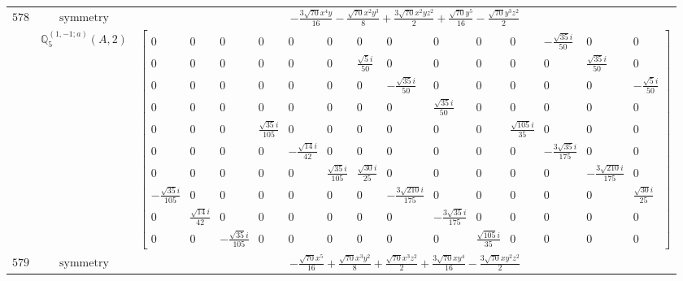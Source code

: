 \documentclass[fleqn,8pt,landscape]{jsarticle}
\begin{document}
\begin{longtable}{ccc}
$ 578 $ & $ \text{symmetry} $ & $ - \frac{3 \sqrt{70} x^{4} y}{16} - \frac{\sqrt{70} x^{2} y^{3}}{8} + \frac{3 \sqrt{70} x^{2} y z^{2}}{2} + \frac{\sqrt{70} y^{5}}{16} - \frac{\sqrt{70} y^{3} z^{2}}{2} $ \\
$  $ & $ \mathbb{Q}_{5}^{(1,-1;a)}(A,2) $ & $ \begin{bmatrix} 0 & 0 & 0 & 0 & 0 & 0 & 0 & 0 & 0 & 0 & 0 & - \frac{\sqrt{35} i}{50} & 0 & 0 \\ 0 & 0 & 0 & 0 & 0 & 0 & \frac{\sqrt{5} i}{50} & 0 & 0 & 0 & 0 & 0 & \frac{\sqrt{35} i}{50} & 0 \\ 0 & 0 & 0 & 0 & 0 & 0 & 0 & - \frac{\sqrt{35} i}{50} & 0 & 0 & 0 & 0 & 0 & - \frac{\sqrt{5} i}{50} \\ 0 & 0 & 0 & 0 & 0 & 0 & 0 & 0 & \frac{\sqrt{35} i}{50} & 0 & 0 & 0 & 0 & 0 \\ 0 & 0 & 0 & \frac{\sqrt{35} i}{105} & 0 & 0 & 0 & 0 & 0 & 0 & \frac{\sqrt{105} i}{35} & 0 & 0 & 0 \\ 0 & 0 & 0 & 0 & - \frac{\sqrt{14} i}{42} & 0 & 0 & 0 & 0 & 0 & 0 & - \frac{3 \sqrt{35} i}{175} & 0 & 0 \\ 0 & 0 & 0 & 0 & 0 & \frac{\sqrt{35} i}{105} & \frac{\sqrt{30} i}{25} & 0 & 0 & 0 & 0 & 0 & - \frac{3 \sqrt{210} i}{175} & 0 \\ - \frac{\sqrt{35} i}{105} & 0 & 0 & 0 & 0 & 0 & 0 & - \frac{3 \sqrt{210} i}{175} & 0 & 0 & 0 & 0 & 0 & \frac{\sqrt{30} i}{25} \\ 0 & \frac{\sqrt{14} i}{42} & 0 & 0 & 0 & 0 & 0 & 0 & - \frac{3 \sqrt{35} i}{175} & 0 & 0 & 0 & 0 & 0 \\ 0 & 0 & - \frac{\sqrt{35} i}{105} & 0 & 0 & 0 & 0 & 0 & 0 & \frac{\sqrt{105} i}{35} & 0 & 0 & 0 & 0 \end{bmatrix} $ \\ \hline
$ 579 $ & $ \text{symmetry} $ & $ - \frac{\sqrt{70} x^{5}}{16} + \frac{\sqrt{70} x^{3} y^{2}}{8} + \frac{\sqrt{70} x^{3} z^{2}}{2} + \frac{3 \sqrt{70} x y^{4}}{16} - \frac{3 \sqrt{70} x y^{2} z^{2}}{2} $ \\

\end{longtable}
\end{document}
